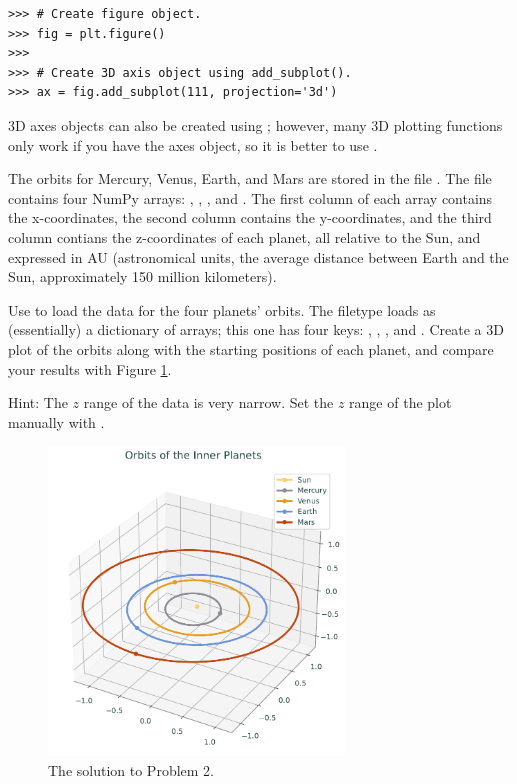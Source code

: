 \begin{lstlisting}
>>> # Create figure object.
>>> fig = plt.figure()
>>>
>>> # Create 3D axis object using add_subplot().
>>> ax = fig.add_subplot(111, projection='3d')
\end{lstlisting}

3D axes objects can also be created using ; however, many 3D plotting functions only work if you have the axes object, so it is better to use .

\begin{problem}
The orbits for Mercury, Venus, Earth, and Mars are stored in the file .
The file contains four NumPy arrays: , , , and .
The first column of each array contains the x-coordinates, the second column contains the y-coordinates, and the third column contians the z-coordinates of each planet, all relative to the Sun, and expressed in AU (astronomical units, the average distance between Earth and the Sun, approximately 150 million kilometers).

Use  to load the data for the four planets' orbits.
The  filetype loads as (essentially) a dictionary of arrays; this one has four keys: , , , and .
Create a 3D plot of the orbits along with the starting positions of each planet, and compare your results with Figure \ref{lab0:3dplot}.

Hint: The $z$ range of the data is very narrow. 
Set the $z$ range of the plot manually with .
\end{problem}

\begin{figure}[h]
\centering
\includegraphics[width=0.7\textwidth]{figures/orbits.pdf}
\caption{The solution to Problem 2.}
\label{lab0:3dplot}
\end{figure}


